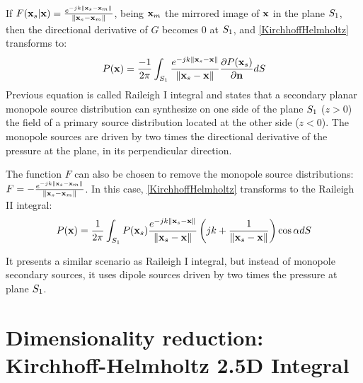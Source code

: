 If $F(\PosTheo[surface] \vert \PosTheo) = \GreenFunc[ {\PosTheo[surface] - \PosTheo[mirrored]} ]$, being $\PosTheo[mirrored]$ the mirrored image of $\PosTheo$ in the plane $S_1$, then the directional derivative of $G$ becomes $0$ at $S_1$, and \autoref{KirchhoffHelmholtz} transforms to:
\begin{equation}
P(\PosTheo) = \frac{-1}{2\pi} \int_{\surfaceTheoRayleighPlane} \GreenFunc[{\PosTheo[surface] - \PosTheo}] \frac{\partial P(\PosTheo[surface])}{\partial \mathbf{n}} dS
\label{RayleighI}
\end{equation}
Previous equation is called Raileigh I integral and states that a secondary planar monopole source distribution can synthesize on one side of the plane $S_1$ ($z>0$) the field of a primary source distribution located at the other side ($z<0$). The monopole sources are driven by two times the directional derivative of the pressure at the plane, in its perpendicular direction.

The function $F$ can also be chosen to remove the monopole source distributions: $F = -\GreenFunc[ {\PosTheo[surface] - \PosTheo[mirrored]} ]$. In this case, \autoref{KirchhoffHelmholtz} transforms to the Raileigh II integral:
\begin{equation}
P(\PosTheo) = \frac{1}{2\pi} \int_{\surfaceTheoRayleighPlane} P(\PosTheo[surface]) \GreenFunc[{\PosTheo[surface] - \PosTheo}] \left(jk + \frac{1}{\norm{\PosTheo[surface] - \PosTheo}}\right)\cos\normSecondPropAngle dS
\label{RayleighII}
\end{equation}

It presents a similar scenario as Raileigh I integral, but instead of monopole secondary sources, it uses dipole sources driven by two times the pressure at plane $S_1$.

\section{Dimensionality reduction: Kirchhoff-Helmholtz 2.5D Integral}



